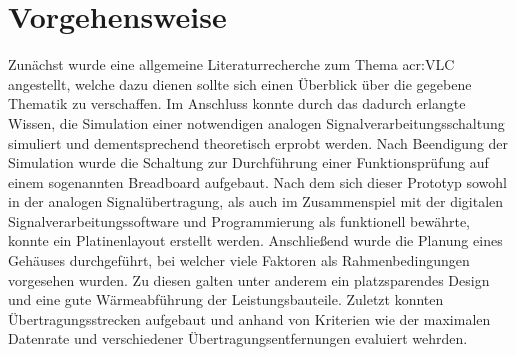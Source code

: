 \section{Vorgehensweise}
\label{sec:method}
Zunächst wurde eine allgemeine Literaturrecherche zum Thema \gls{acr:VLC} angestellt, welche dazu dienen sollte sich einen Überblick über die gegebene Thematik zu verschaffen. Im Anschluss konnte durch das dadurch erlangte Wissen, die Simulation einer notwendigen analogen Signalverarbeitungsschaltung simuliert und dementsprechend theoretisch erprobt werden. Nach Beendigung der Simulation wurde die Schaltung zur Durchführung einer Funktionsprüfung auf einem sogenannten Breadboard aufgebaut. Nach dem sich dieser Prototyp sowohl in der analogen Signalübertragung, als auch im Zusammenspiel mit der digitalen Signalverarbeitungssoftware und Programmierung als funktionell bewährte, konnte ein Platinenlayout erstellt werden. Anschließend wurde die Planung eines Gehäuses durchgeführt, bei welcher viele Faktoren als Rahmenbedingungen vorgesehen wurden. Zu diesen galten unter anderem ein platzsparendes Design und eine gute Wärmeabführung der Leistungsbauteile. Zuletzt konnten Übertragungsstrecken aufgebaut und anhand von Kriterien wie der maximalen Datenrate und verschiedener Übertragungsentfernungen evaluiert wehrden. 

